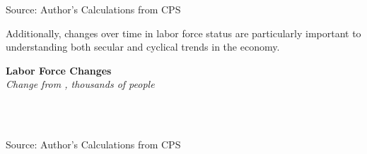 \documentclass{report}
\begin{document}
{{{{{{{\begin{minipage}{0.76\textwidth}
\vspace{-3mm}		
		
\footnotesize{Source: Author's Calculations from CPS}\\

\vspace{3mm}

\small Additionally, changes over time in labor force status are particularly important to understanding both secular and cyclical trends in the economy. \\ 

\vspace{2mm}


\noindent \normalsize \textbf{Labor Force Changes}\\
\footnotesize{\textit{Change from , thousands of people}}\\

\vspace{-3mm}

\noindent {} \setlength{\tabcolsep}{3.0pt} \color{black!90}
		{\renewcommand{\arraystretch}{1.52}
		 \begin{tabular}{p{27.8mm} R{11.2mm} R{10.4mm} R{10.4mm} R{10.2mm} R{10.6mm} R{10.4mm} R{10.4mm}}
			 \hline
		\end{tabular}
		}	\\
		
\vspace{-3mm}	
	
\footnotesize{Source: Author's Calculations from CPS}


\end{minipage}

\newpage

}}}}}}}
\end{document}
